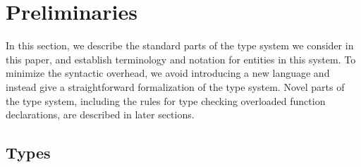 \documentclass[10pt]{sigplanconf}
\begin{document}



\section{Preliminaries}\label{sec:pre}
In this section, 
we describe the standard parts of the type system 
we consider in this paper, 
and establish terminology and notation 
for entities in this system.
To minimize the syntactic overhead, 
we avoid introducing a new language 
and instead give a straightforward formalization of the type system.
Novel parts of the type system, 
including the rules for type checking overloaded function declarations, 
are described in later sections.

\subsection{Types}
\end{document}
